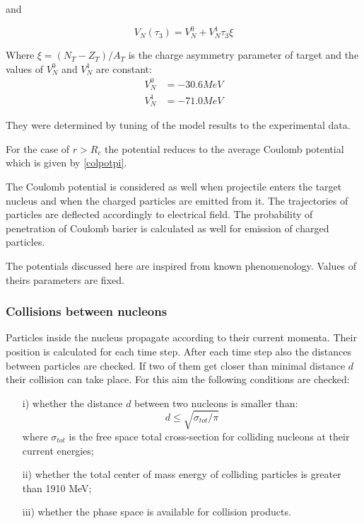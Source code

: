 and 

\begin{equation}
	V_N(\tau_3)=V_N^{0} + V_N^{1} \tau_3 \xi 
\end{equation}

Where $\xi=(N_T-Z_T)/A_T$ is the charge asymmetry parameter of target 
and the values of $V_N^{0}$ and $V_N^{1}$ are constant: 
\begin{align}
	V_N^{0}&=-30.6 MeV\\
	V_N^{1}&=-71.0 MeV 			
\end{align}\par

They were determined by tuning of the model results to the experimental data.

For the case of $r > R_c$  the potential reduces to the average Coulomb potential which is given by \eqref{colpotpi}.

The Coulomb potential is considered as well when projectile enters the target nucleus and when the charged particles are emitted from it.
The trajectories of particles are deflected accordingly to electrical field. The probability of penetration of Coulomb barier 
is calculated as well for emission of charged particles.

The potentials discussed here are inspired from known phenomenology. Values of theirs parameters are fixed. 




\subsubsection{Collisions between nucleons}

Particles inside the nucleus propagate according to their current momenta. Their position is calculated for each time step.
After each time step also the distances between particles are checked. If two of them get closer than minimal distance $d$ 
their collision can take place. 
For this aim the following conditions are checked:
\begin{itemize}
\item[i)] whether the distance $d$ between two nucleons is smaller than:
\begin{equation}
	d\leq\sqrt{\sigma_{tot}/\pi}
\end{equation}
where $\sigma_{tot}$ is the free space total cross-section for colliding nucleons at their current energies; 
\item[ii)] whether the total center of mass energy of colliding particles is greater than 1910 MeV;
\item [iii)]whether the phase space is available for collision products. 
\end{itemize}

